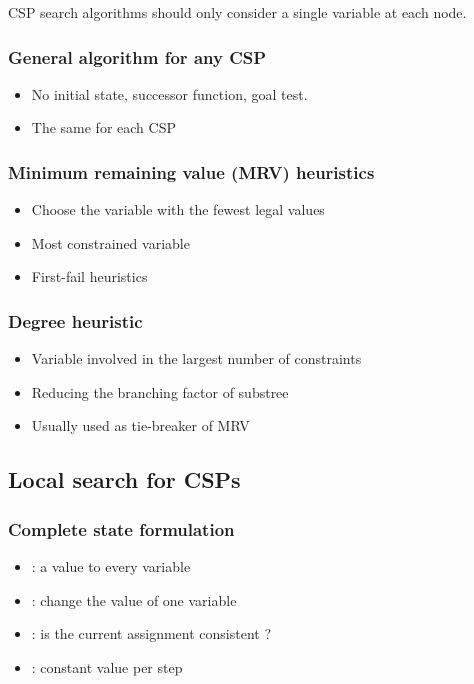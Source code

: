 CSP search algorithms should only consider a single variable at each node.

\subsubsection{General algorithm for any CSP}

\begin{itemize}
\item No initial state, successor function, goal test.
\item The same for each CSP
\end{itemize}

\subsubsection{Minimum remaining value (MRV) heuristics}

\begin{itemize}
\item Choose the variable with the fewest legal values
\item Most constrained variable
\item First-fail heuristics
\end{itemize}

\subsubsection{Degree heuristic}

\begin{itemize}
\item Variable involved in the largest number of constraints
\item Reducing the branching factor of substree
\item Usually used as tie-breaker of MRV
\end{itemize}

\subsection{Local search for CSPs}

\subsubsection{Complete state formulation}

\begin{itemize}
\item {} : a value to every variable
\item {} : change the value of one variable
\item {} : is the current assignment consistent ?
\item {} : constant value per step
\end{itemize}

